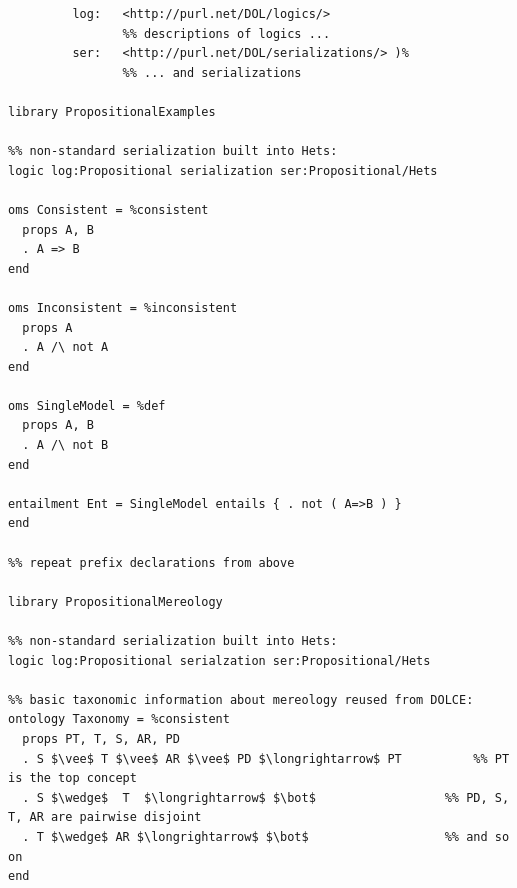 \documentclass[10pt, a4paper]{isov2}
\begin{document}
\label{ex:prop}
\begin{lstlisting}[basicstyle=\ttfamily,language=dolText,alsolanguage=prop,escapechar=@,mathescape]
%prefix( :      <http://www.example.org/prop#>
         log:   <http://purl.net/DOL/logics/>
                %% descriptions of logics ...
         ser:   <http://purl.net/DOL/serializations/> )%
                %% ... and serializations

library PropositionalExamples

%% non-standard serialization built into Hets: 
logic log:Propositional serialization ser:Propositional/Hets       

oms Consistent = %consistent
  props A, B
  . A => B
end

oms Inconsistent = %inconsistent
  props A
  . A /\ not A
end

oms SingleModel = %def
  props A, B
  . A /\ not B
end

entailment Ent = SingleModel entails { . not ( A=>B ) }
end

%% repeat prefix declarations from above

library PropositionalMereology

%% non-standard serialization built into Hets: 
logic log:Propositional serialzation ser:Propositional/Hets

%% basic taxonomic information about mereology reused from DOLCE:
ontology Taxonomy = %consistent
  props PT, T, S, AR, PD
  . S $\vee$ T $\vee$ AR $\vee$ PD $\longrightarrow$ PT          %% PT is the top concept
  . S $\wedge$  T  $\longrightarrow$ $\bot$                  %% PD, S, T, AR are pairwise disjoint
  . T $\wedge$ AR $\longrightarrow$ $\bot$                   %% and so on
end
\end{lstlisting}


\label{ex:engine}
\end{document}
